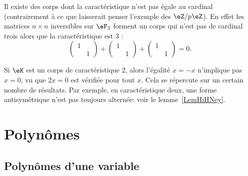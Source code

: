 \begin{example}
    Il existe des corps dont la caractéristique n'est pas égale au cardinal (contrairement à ce que laisserait penser l'exemple des \( \eZ/p\eZ\)). En effet les matrices \( n\times n\) inversibles sur \( \eF_{3}\) forment un corps qui n'est pas de cardinal trois alors que la caractéristique est \( 3\) :
    \begin{equation}
        \begin{pmatrix}
            1    &       \\
                &   1
            \end{pmatrix}+\begin{pmatrix}
                1    &       \\
                    &   1
                \end{pmatrix}+\begin{pmatrix}
                    1    &       \\
                        &   1
                \end{pmatrix}=0.
    \end{equation}
\end{example}

\begin{example}
    Si \( \eK\) est un corps de caractéristique \( 2\), alors l'égalité \( x=-x\) n'implique pas \( x=0\), vu que \( 2x=0\) est vérifiée pour tout \( x\). Cela se répercute sur un certain nombre de résultats. Par exemple, en caractéristique deux, une forme antisymétrique n'est pas toujours alternée: voir le lemme~\ref{LemHiHNey}.
\end{example}



\section{Polynômes}

\subsection{Polynômes d'une variable}

